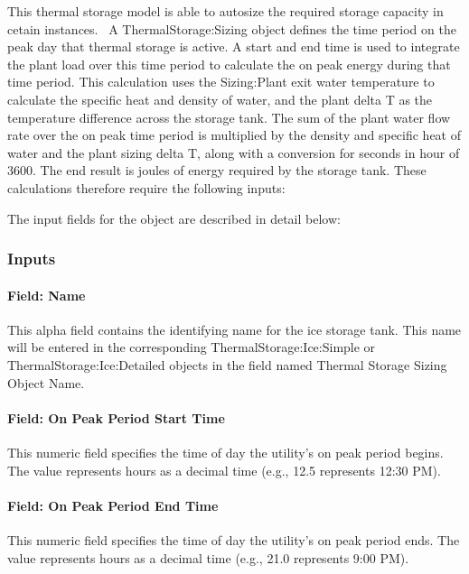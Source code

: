 This thermal storage model is able to autosize the required storage capacity in cetain instances.~
A ThermalStorage:Sizing object defines the time period on the peak day that thermal storage is active. A start and end time is used to integrate the plant load over this time period to calculate the on peak energy during that time period. This calculation uses the Sizing:Plant exit water temperature to calculate the specific heat and density of water, and the plant delta T as the temperature difference across the storage tank. The sum of the plant water flow rate over the on peak time period is multiplied by the density and specific heat of water and the plant sizing delta T, along with a conversion for seconds in hour of 3600. The end result is joules of energy required by the storage tank. These calculations therefore require the following inputs:

The input fields for the object are described in detail below:

\subsubsection{Inputs}\label{inputs-20-103}

\paragraph{Field: Name}\label{field-name-20-104}

This alpha field contains the identifying name for the ice storage tank. This name will be entered in the corresponding ThermalStorage:Ice:Simple or ThermalStorage:Ice:Detailed objects in the field named Thermal Storage Sizing Object Name.

\paragraph{Field: On Peak Period Start Time}\label{field-on-peak-period-start-time}

This numeric field specifies the time of day the utility's on peak period begins. The value represents hours as a decimal time (e.g., 12.5 represents 12:30 PM).

\paragraph{Field: On Peak Period End Time}\label{field-on-peak-period-end-time}

This numeric field specifies the time of day the utility's on peak period ends. The value represents hours as a decimal time (e.g., 21.0 represents 9:00 PM).

